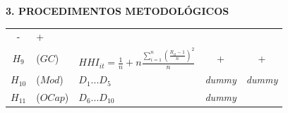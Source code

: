 \documentclass[ignorenonframetext,aspectratio=169,ignorenonframetext]{beamer}
\begin{document}
\begin{frame}{\textbf{3. PROCEDIMENTOS METODOLÓGICOS}}
\begin{longtable}[]{@{}cllcc@{}}
\begin{minipage}[t]{0.11\columnwidth}
-\strut
\end{minipage} & \begin{minipage}[t]{0.11\columnwidth}\centering
+\strut
\end{minipage}\tabularnewline
\begin{minipage}[t]{0.11\columnwidth}\centering
\(H_{9}\)\strut
\end{minipage} & \begin{minipage}[t]{0.15\columnwidth}\raggedright
(\(GC\))\strut
\end{minipage} & \begin{minipage}[t]{0.39\columnwidth}\raggedright
\(HHI_{it} = \frac{1}{n} + n\frac{\sum_{i=1}^{n}(\frac{R_{it} - 1}{n})^2}{n}\)\strut
\end{minipage} & \begin{minipage}[t]{0.11\columnwidth}\centering
+\strut
\end{minipage} & \begin{minipage}[t]{0.11\columnwidth}\centering
+\strut
\end{minipage}\tabularnewline
\begin{minipage}[t]{0.11\columnwidth}\centering
\(H_{10}\)\strut
\end{minipage} & \begin{minipage}[t]{0.15\columnwidth}\raggedright
(\(Mod\))\strut
\end{minipage} & \begin{minipage}[t]{0.39\columnwidth}\raggedright
\(D_{1}...D_{5}\)\strut
\end{minipage} & \begin{minipage}[t]{0.11\columnwidth}\centering
\emph{dummy}\strut
\end{minipage} & \begin{minipage}[t]{0.11\columnwidth}\centering
\emph{dummy}\strut
\end{minipage}\tabularnewline
\begin{minipage}[t]{0.11\columnwidth}\centering
\(H_{11}\)\strut
\end{minipage} & \begin{minipage}[t]{0.15\columnwidth}\raggedright
(\(OCap\))\strut
\end{minipage} & \begin{minipage}[t]{0.39\columnwidth}\raggedright
\(D_{6}...D_{10}\)\strut
\end{minipage} & \begin{minipage}[t]{0.11\columnwidth}\centering
\emph{dummy}\strut
\end{minipage} & \begin{minipage}[t]{0.11\columnwidth}\centering

\end{minipage}
\end{longtable}
\end{frame}
\end{document}
